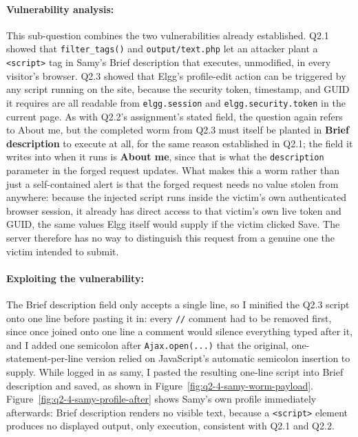 
\dranswer

\paragraph{Vulnerability analysis:} This sub-question combines the two vulnerabilities already established. Q2.1 showed that \texttt{filter\_tags()} and \texttt{output/text.php} let an attacker plant a \texttt{<script>} tag in Samy's Brief description that executes, unmodified, in every visitor's browser. Q2.3 showed that Elgg's profile-edit action can be triggered by any script running on the site, because the security token, timestamp, and GUID it requires are all readable from \texttt{elgg.session} and \texttt{elgg.security.token} in the current page. As with Q2.2's assignment's stated field, the question again refers to \textquotedbl{}About me\textquotedbl{}, but the completed worm from Q2.3 must itself be planted in \textbf{Brief description} to execute at all, for the same reason established in Q2.1; the field it writes into when it runs is \textbf{About me}, since that is what the \texttt{description} parameter in the forged request updates. What makes this a worm rather than just a self-contained alert is that the forged request needs no value stolen from anywhere: because the injected script runs inside the victim's own authenticated browser session, it already has direct access to that victim's own live token and GUID, the same values Elgg itself would supply if the victim clicked Save. The server therefore has no way to distinguish this request from a genuine one the victim intended to submit.

\paragraph{Exploiting the vulnerability:} The Brief description field only accepts a single line, so I minified the Q2.3 script onto one line before pasting it in: every \texttt{//} comment had to be removed first, since once joined onto one line a comment would silence everything typed after it, and I added one semicolon after \texttt{Ajax.open(...)} that the original, one-statement-per-line version relied on JavaScript's automatic semicolon insertion to supply. While logged in as samy, I pasted the resulting one-line script into Brief description and saved, as shown in Figure~\ref{fig:q2-4-samy-worm-payload}. Figure~\ref{fig:q2-4-samy-profile-after} shows Samy's own profile immediately afterwards: Brief description renders no visible text, because a \texttt{<script>} element produces no displayed output, only execution, consistent with Q2.1 and Q2.2.

